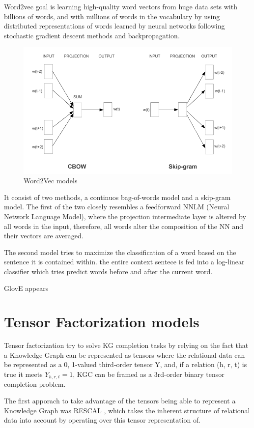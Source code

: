 Word2vec\cite{} goal is learning high-quality word vectors from huge data sets with billions of words, and with millions of words in the vocabulary by using distributed representations of words learned by neural networks following stochastic gradient descent methods and backpropagation.

\begin{figure}[!htp]
    \centering
    \includegraphics[width=.75\textwidth]{fig/embeddings/Word2Vec.png}
    \caption{Word2Vec models}
    \label{fig:emb-rotatE}
\end{figure}

It consist of two methods, a continuos bag-of-words model and a skip-gram model. The first of the two closely resembles a feedforward NNLM (Neural Network Language Model), where the projection intermediate layer is altered by all words in the input, therefore, all words alter the composition of the NN and their vectors are averaged.

The second model tries to maximize the classification of a word based on the sentence it is contained within. the entire context sentece is fed into a log-linear classifier which tries predict words before and after the current word.

GlovE \cite{} appears 

\section{Tensor Factorization models}\label{sec:emb-tensor}
Tensor factorization try to solve KG completion tasks by relying on the fact that a Knowledge Graph can be represented as tensors where the relational data can be represented as a {0, 1}-valued third-order tensor Y, and, if a relation (h, r, t) is true it meets $Y_{h,r,t} = 1$, KGC can be framed as a 3rd-order binary tensor completion problem.

The first apporach to take advantage of the tensors being able to represent a Knowledge Graph was RESCAL \cite{}, which takes the inherent structure of relational data into account by operating over this tensor representation of.

